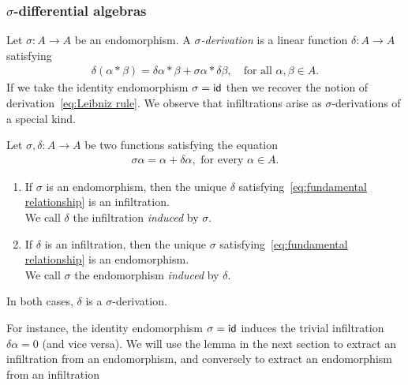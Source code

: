 \subsubsection{$\sigma$-differential algebras}

Let $\sigma : A \to A$ be an endomorphism.
A \emph{$\sigma$-derivation} is a linear function $\delta : A \to A$ satisfying 
%
\begin{align}
    \label{eq:sigma-derivation rule}
    \tag{$\sigma$-derivation rule}
    \delta(\alpha * \beta) = \delta \alpha * \beta + \sigma \alpha * \delta \beta,
        \quad\text{for all } \alpha, \beta \in A.
\end{align}
%
If we take the identity endomorphism $\sigma = \mathsf{id}$ then we recover the notion of derivation~\cref{eq:Leibniz rule}.
%
We observe that infiltrations arise as $\sigma$-derivations of a special kind.
%
\begin{lemma}
    \label{lem:fundamental relationship}
    Let $\sigma, \delta : A \to A$ be two functions satisfying the equation
    \begin{align}
        \label{eq:fundamental relationship}
        \tag{$\sigma$-$\delta$}
        \sigma \alpha = \alpha + \delta \alpha,
            \text{ for every } \alpha \in A.
    \end{align}
    \begin{enumerate}

        \item If $\sigma$ is an endomorphism,
        then the unique $\delta$ satisfying~\cref{eq:fundamental relationship} is an infiltration.
        \\
        We call $\delta$ the infiltration \emph{induced} by $\sigma$.

        \item If $\delta$ is an infiltration,
        then the unique $\sigma$ satisfying~\cref{eq:fundamental relationship} is an endomorphism.
        \\
        We call $\sigma$ the endomorphism \emph{induced} by $\delta$.

    \end{enumerate}
    In both cases, $\delta$ is a $\sigma$-derivation.
\end{lemma}
%
\noindent
For instance, the identity endomorphism $\sigma = \mathsf{id}$
induces the trivial infiltration $\delta \alpha = 0$ (and vice versa).
%
We will use the lemma in the next section to extract an infiltration from an endomorphism,
and conversely to extract an endomorphism from an infiltration
